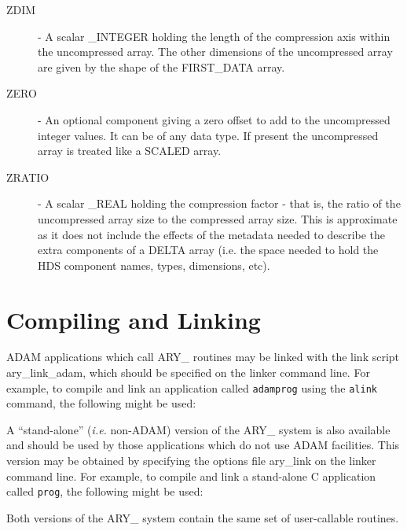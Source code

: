 \documentclass[twoside,11pt,nolof]{starlink}
\begin{document}
\begin{description}
\item[ZDIM] - A scalar \_INTEGER holding the length of the compression axis
within the uncompressed array. The other dimensions of the uncompressed array
are given by the shape of the FIRST\_DATA array.

\item[ZERO] - An optional component giving a zero offset to add to the
uncompressed integer values. It can be of any data type. If present the
uncompressed array is treated like a SCALED array.

\item[ZRATIO] - A scalar \_REAL holding the compression factor - that is, the
ratio of the uncompressed array size to the compressed array size. This
is approximate as it does not include the effects of the metadata needed
to describe the extra components of a DELTA array (i.e. the space needed
to hold the HDS component names, types, dimensions, etc).

\end{description}

\section{Compiling and Linking}
\label{compiling_and_linking}

ADAM applications which call ARY\_ routines may be linked with the link
script \mbox{ary\_link\_adam}, which should be specified on the linker
command line.  For example, to compile and link an application called
\texttt{adamprog} using the \texttt{alink} command, the following might be
used:

\begin{terminalv}
\end{terminalv}

A ``stand-alone'' (\emph{i.e.} non-ADAM) version of the ARY\_ system is
also available and should be used by those applications which do not
use ADAM facilities.  This version may be obtained by specifying the
options file \mbox{ary\_link} on the linker command line.  For example,
to compile and link a stand-alone C application called \texttt{prog}, the
following might be used:

\begin{terminalv}
\end{terminalv}

Both versions of the ARY\_ system contain the same set of user-callable
routines.
\end{document}
